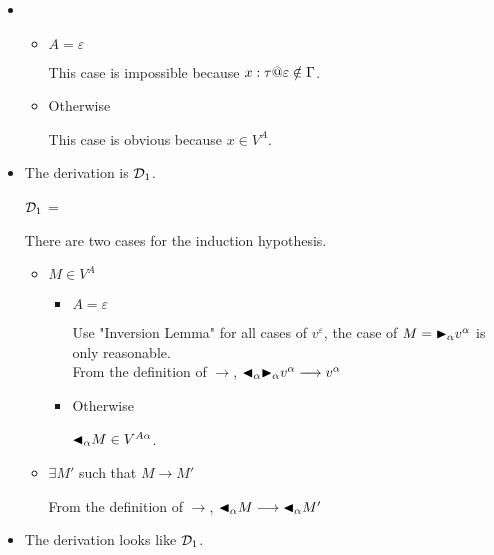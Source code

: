 \begin{itemize}
	\item \TVar
	      \begin{itemize}
		      \item $ A = \varepsilon$

		            This case is impossible because $x:\tau@\varepsilon \notin \G$.
		      \item Otherwise

		            This case is obvious because $x \in V^A$.
	      \end{itemize}

	\item \TTBL

	      The derivation is $\mathcal{D}_1$.

	      $\mathcal{D}_1$ = 
	      {}

	      There are two cases for the induction hypothesis.

	      \begin{itemize}

		      \item $ M \in V^A $

		            \begin{itemize}
			            \item $ A = \varepsilon $

			                  Use "Inversion Lemma" for all cases of $v^\varepsilon$, the case of $ M = {\mathop{\blacktriangleright}}_\alpha v^\alpha $ is only reasonable.\\
			                  From the definition of $ \longrightarrow $, ${\mathop{\blacktriangleleft}}_\alpha {\mathop{\blacktriangleright}}_\alpha v^\alpha \longrightarrow v^\alpha$

			            \item Otherwise

			                  $ {\mathop{\blacktriangleleft}}_\alpha M \in V^{A\alpha}$.
		            \end{itemize}

		      \item $\exists M'$ such that $M \longrightarrow M'$

		            From the definition of $ \longrightarrow $, ${\mathop{\blacktriangleleft}}_\alpha M \longrightarrow {\mathop{\blacktriangleleft}}_\alpha M'$

	      \end{itemize}

	\item \TApp

	      The derivation looks like $\mathcal{D}_1$.


\end{itemize}
